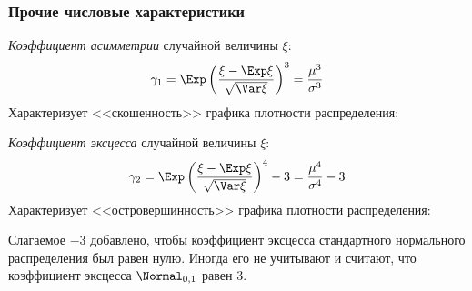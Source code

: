 \subsubsection{Прочие числовые характеристики}

\begin{defn}
    \textit{Коэффициент асимметрии} случайной величины $\xi$:
    \begin{equation*}
        \gamma_1=\Exp \left(\frac{\xi - \Exp \xi}{\sqrt{\Var\xi}}\right)^3 = \frac{\mu^3}{\sigma^3}
    \end{equation*}
    Характеризует <<скошенность>> графика плотности распределения: \medskip\hfill\break
    
\end{defn}

\begin{defn}
    \textit{Коэффициент эксцесса} случайной величины $\xi$:
    \begin{equation*}
        \gamma_2=\Exp \left(\frac{\xi - \Exp \xi}{\sqrt{\Var\xi}}\right)^4 - 3 = \frac{\mu^4}{\sigma^4} - 3
    \end{equation*}
    Характеризует <<островершинность>> графика плотности распределения:
    \medskip\hfill\break
    
\end{defn}

\begin{rmrk}
    Слагаемое $-3$ добавлено, чтобы коэффициент эксцесса стандартного нормального распределения был равен нулю. Иногда его не учитывают и считают, что коэффициент эксцесса $\Normal_{0,1}$ равен 3.
\end{rmrk}
